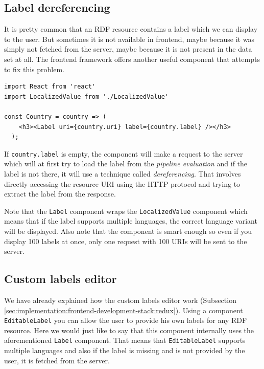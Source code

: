 \subsection{Label dereferencing}
\label{sec:implementation:advanced-features:label-dereferencering}

It is pretty common that an RDF resource contains a label which we can display to the user. But sometimes it is not available in frontend, maybe because it was simply not fetched from the server, maybe because it is not present in the data set at all. The frontend framework offers another useful component that attempts to fix this problem.

\begin{verbatim}
import React from 'react'
import LocalizedValue from './LocalizedValue'

const Country = country => (
    <h3><Label uri={country.uri} label={country.label} /></h3>
  );
\end{verbatim}

If \texttt{country.label} is empty, the component will make a request to the server which will at first try to load the label from the \emph{pipeline evaluation} and if the label is not there, it will use a technique called \emph{dereferencing}. That involves directly accessing the resource URI using the HTTP protocol and trying to extract the label from the response.

Note that the \texttt{Label} component wraps the \texttt{LocalizedValue} component which means that if the label supports multiple languages, the correct language variant will be displayed. Also note that the component is smart enough so even if you display 100 labels at once, only one request with 100 URIs will be sent to the server.

\subsection{Custom labels editor}
\label{sec:implementation:advanced-features:custom-labels-editor}

We have already explained how the custom labels editor work (Subsection \ref{sec:implementation:frontend-development-stack:redux}). Using a component \texttt{EditableLabel} you can allow the user to provide his own labels for any RDF resource. Here we would just like to say that this component internally uses the aforementioned \texttt{Label} component. That means that \texttt{EditableLabel} supports multiple languages and also if the label is missing and is not provided by the user, it is fetched from the server.

